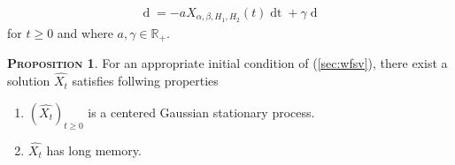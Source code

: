 \documentclass[a4paper, twoside, 11pt]{article}
\theoremstyle{definition}
\newtheorem{proposition}[definition]{\scshape Proposition}
\begin{document}
\begin{eqnarray}
  \mathop{dX_{\alpha,\beta,H_1,H_2}(t)} = -aX_{\alpha,\beta,H_1,H_2}(t)\mathop{dt} + \gamma \mathop{dM_{\alpha,\beta,H_1,H_2}(t)}
  \label{sec:wfsv}
\end{eqnarray}
for $t\ge 0$ and where $a, \gamma \in \mathbb{R}_+$.

\begin{proposition}
  For an appropriate initial condition of (\ref{sec:wfsv}), there exist a solution $\hat{X_t}$ satisfies follwing properties
\begin{enumerate}[topsep=0pt, itemsep=-1ex, partopsep=1ex, parsep=1ex, label=(\roman*)]
  \item $(\hat{X_t})_{t\ge 0}$ is a centered Gaussian stationary process.
  \item $\hat{X_t}$ has long memory.
  \end{enumerate}
\end{proposition}
\end{document}
